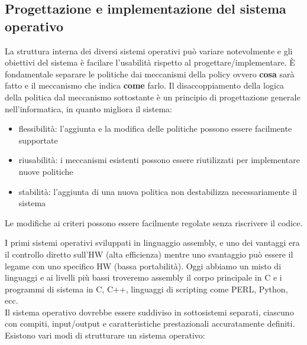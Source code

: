 \documentclass{article}
\begin{document}
\pagebreak

\subsection{Progettazione e implementazione del sistema operativo}
La struttura interna dei diversi sistemi operativi può variare notevolmente e gli obiettivi del sistema è facilare l'usabilità rispetto al progettare/implementare. È fondamentale separare le politiche dai meccanismi della policy ovvero \textbf{cosa} sarà fatto e il meccanismo che indica \textbf{come} farlo.
Il disaccoppiamento della logica della politica dal meccanismo sottostante è un principio di progettazione generale nell'informatica, in quanto migliora il sistema:
\begin{itemize}
    \item flessibilità: l'aggiunta e la modifica delle politiche possono essere facilmente supportate
    \item riusabilità: i meccanismi esistenti possono essere riutilizzati per implementare nuove politiche 
    \item stabilità: l'aggiunta di una nuova politica non destabilizza necessariamente il sistema    
\end{itemize}
Le modifiche ai criteri possono essere facilmente regolate senza riscrivere il codice.

I primi sistemi operativi sviluppati in linguaggio assembly, e uno dei vantaggi era il controllo diretto sull'HW (alta efficienza) mentre uno svantaggio può essere il legame con uno specifico HW (bassa portabilità). Oggi abbiamo un misto di linguaggi e ai livelli più bassi troveremo assembly il corpo principale in C e i programmi di sistema in C, C++, linguaggi di scripting come PERL, Python, ecc.\\
Il sistema operativo dovrebbe essere suddiviso in sottosistemi separati, ciascuno con compiti, input/output e caratteristiche prestazionali accuratamente definiti. Esistono vari modi di strutturare un sistema operativo: 
\end{document}
